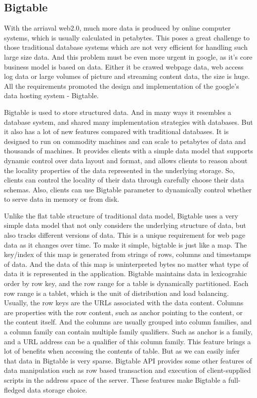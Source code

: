 \documentclass[a4paper]{article}
\begin{document}
\subsection{Bigtable}
With the arriaval web2.0, much more data is produced by online
computer systems, which is usually calculated in petabytes. This poses
a great challenge to those traditional database 
systems which are not very efficient for handling such large size
data. And this problem must be even more urgent in google, as it's core
business model is based on data. Either it be crawed
webpage data, web access log data or large volumes of picture and
streaming content data, the size is huge. All the requirements
promoted the design and implementation of the google's data hosting
system - Bigtable\cite{bigtable:google}. 

Bigtable is used to store structured data. And in many ways it
resembles a database system, and shared many implementation strategies
with databases. But it also has a lot of new features compared
with traditional databases. It is designed to run on commodity
machines and can scale to petabytes of data and thousands of
machines. It provides clients with a simple data model that supports
dynamic control over data layout and format, and allows clients to
reason about the locality properties of the data represented in the
underlying storage. So, clients can control the locality of their data
through carefully choose their data schemas. Also, clients can use
Bigtable parameter to dynamically control whether to serve data in 
memory or from disk. 

Unlike the flat table structure of traditional data model, Bigtable
uses a very simple data model that not only considers the underlying
structure of data, but also tracks different versions of data. This is
a unique requirement for web page data as it changes over
time. To make it simple, bigtable is just like a map. The key/index of
this map is generated from strings of rows, columns and timestamps
of data. And the data of this map is uninterpreted bytes no matter
what type of data it is represented in the application. Bigtable
maintains data in lexicograhic order by row key, and the row range for
a table is dynamically partitioned. Each row range is a tablet, which
is the unit of distribution and load balancing. Usually, the row keys
are the URLs associated with the data content. Columns are properties
with the row content, such as anchor pointing to the content, or the
content itself. And the columns are usually grouped into column
families, and a column family can contain multiple family
qualifiers. Such as anchor is a family, and a URL address can be a
qualifier of this column family. This feature brings a lot of
benefits when accessing the contents of table. But as we can easily
infer that data in Bigtable is very sparse. Bigtable API provides some
other features of data manipulation such as row based transaction and
execution of client-supplied scripts in the address space of the
server. These features make Bigtable a full-fledged data storage
choice. 
\end{document}
